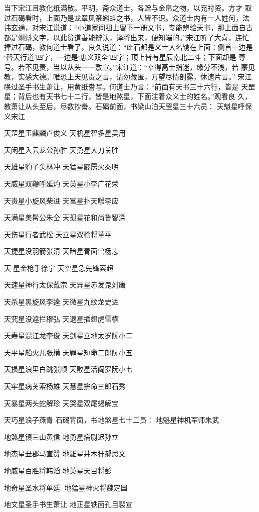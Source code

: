 当下宋江且教化纸满散。平明，斋众道士，各赠与金帛之物，以充衬资。方才
取过石碣看时，上面乃是龙章凤篆蝌蚪之书，人皆不识。众道士内有一人姓何，法
讳玄通，对宋江说道：“小道家间祖上留下一册文书，专能辨验天书，那上面自古
都是蝌蚪文字，以此贫道善能辨认，译将出来，便知端的。”宋江听了大喜，连忙
捧过石碣，教何道士看了，良久说道：“此石都是义士大名镌在上面：侧首一边是
‘替天行道’四字，一边是‘忠义双全’四字；顶上皆有星辰南北二斗；下面却是
尊号。若不见责，当以从头一一敷宣。”宋江道：“幸得高士指迷，缘分不浅，若
蒙见教，实感大德。唯恐上天见责之言，请勿藏匿，万望尽情剖露，休遗片言。”
宋江唤过圣手书生萧让，用黄纸誊写。何道士乃言：“前面有天书三十六行，皆是
天罡星；背后也有天书七十二行，皆是地煞星，下面注着众义士的姓名。”观看良
久，教萧让从头至后，尽数抄誊。石碣前面，书梁山泊天罡星三十六员：
天魁星呼保义宋江

天罡星玉麒麟卢俊义
天机星智多星吴用

天闲星入云龙公孙胜
天勇星大刀关胜

天雄星豹子头林冲
天猛星霹雳火秦明

天威星双鞭呼延灼
天英星小李广花荣

天贵星小旋风柴进
天富星扑天雕李应

天满星美髯公朱仝
天孤星花和尚鲁智深

天伤星行者武松
天立星双枪将董平

天捷星没羽箭张清
天暗星青面兽杨志

天星金枪手徐宁
天空星急先锋索超

天速星神行太保戴宗
天异星赤发鬼刘唐

天杀星黑旋风李逵
天微星九纹龙史进

天究星没遮拦穆弘
天退星插翅虎雷横

天寿星混江龙李俊
天剑星立地太岁阮小二

天平星船火儿张横
天罪星短命二郎阮小五

天损星浪里白跳张顺
天败星活阎罗阮小七

天牢星病关索杨雄
天慧星拚命三郎石秀

天暴星两头蛇解珍
天哭星双尾蝎解宝

天巧星浪子燕青
石碣背面，书地煞星七十二员：
地魁星神机军师朱武

地煞星镇三山黄信
地勇星病尉迟孙立

地杰星丑郡马宣赞
地雄星井木犴郝思文

地威星百胜将韩滔
地英星天目将彭

地奇星圣水将单廷
地猛星神火将魏定国

地文星圣手书生萧让
地正星铁面孔目裴宣

